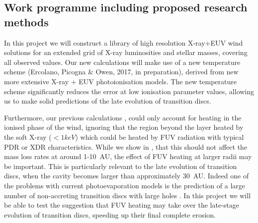 \documentclass[10pt,fleqn,twoside]{article}
\begin{document}




\subsection{Work programme including proposed research methods}
In this project we will construct a
library of high resolution X-ray+EUV wind solutions for an extended grid of
X-ray luminosities and stellar masses, covering all observed
values. Our new calculations will make use of a new temperature
scheme (Ercolano, Picogna \& Owen, 2017, in preparation), derived from
new more extensive X-ray + EUV photoionisation models.  The new
temperature scheme
significantly reduces the error at low ionisation parameter values,
allowing us to make solid predictions of the late evolution of
transition discs. 

Furthermore, our previous calculations 
\citep{2010MNRAS.401.1415O, 2011MNRAS.412...13O, 2012MNRAS.422.1880O},
could only account for heating 
in the ionised phase of the wind, ignoring that the region beyond the
layer heated by the soft X-ray ($<1keV$) which could be heated by FUV
radiation with typical PDR or XDR characteristics. While we show in
\citet{2012MNRAS.422.1880O},
that this should not affect the mass loss rates at
around 1-10~AU, the effect of FUV heating at larger radii may be
important. This is particularly relevant to the late evolution of
transition discs, when the cavity becomes larger than approximately
30~AU. Indeed one of the
problems with current photoevaporation models is the prediction of a
large number of non-accreting transition discs with large holes
\citep[e.g.,][]{2016PASA...33....5O}.
In this project we will be able to test the
suggestion that FUV heating may take over the late-stage evolution of
transition discs, speeding up their final complete erosion. 

\end{document}
